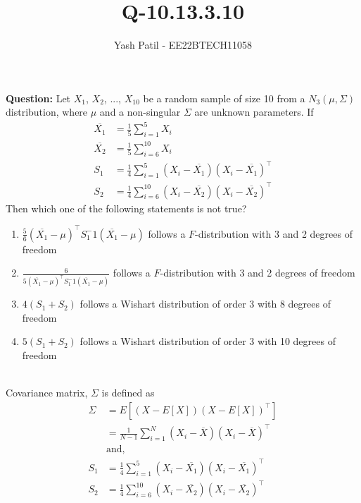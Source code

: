 \documentclass[journal,12pt,twocolumn]{IEEEtran}
\theoremstyle{remark}
\begin{document}



\vspace{3cm}

\title{
Q-10.13.3.10
}
\author{Yash Patil - EE22BTECH11058}

\maketitle
\textbf{Question:} Let $X_1$, $X_2$, ..., $X_{10}$ be a random sample of size 10 from a $N_3(\mu,\Sigma)$ distribution, where $\mu$ and a non-singular $\Sigma$ are unknown parameters. If
\begin{align}
	\overline{X_1} &= \frac{1}{5}\sum_{i=1}^5X_i\\
	\overline{X_2} &= \frac{1}{5}\sum_{i=6}^{10}X_i\\
	S_1 &= \frac{1}{4}\sum_{i=1}^5(X_i-\overline{X_1})(X_i-\overline{X_1})^\top\\
	S_2 &= \frac{1}{4}\sum_{i=6}^{10}(X_i-\overline{X_2})(X_i-\overline{X_2})^\top
\end{align}
Then which one of the following statements is not true?
\begin{enumerate}
	\item $\frac{5}{6}(\overline{X_1}-\mu)^{\top}S_1^-1(\overline{X_1}-\mu)$ follows a $F$-distribution with 3 and 2 degrees of freedom
	\item $\frac{6}{5(\overline{X_1}-\mu)^{\top}S_1^-1(\overline{X_1}-\mu)}$ follows a $F$-distribution with 3 and 2 degrees of freedom
	\item $4(S_1 + S_2)$ follows a Wishart distribution of order 3 with 8 degrees of freedom
	\item $5(S_1 + S_2)$ follows a Wishart distribution of order 3 with 10 degrees of freedom
\end{enumerate}
\solution\\
Covariance matrix, $\Sigma$ is defined as
\begin{align}
	\Sigma &= E[(X-E[X])(X-E[X])^\top]\\
	&= \frac{1}{N-1}\sum_{i=1}^N(X_i-\overline{X})(X_i-\overline{X})^\top\\
	&\text{and,}\\
	S_1 &= \frac{1}{4}\sum_{i=1}^5(X_i-\overline{X_1})(X_i-\overline{X_1})^\top\\
	S_2 &= \frac{1}{4}\sum_{i=6}^{10}(X_i-\overline{X_2})(X_i-\overline{X_2})^\top
\end{align}
\end{document}
